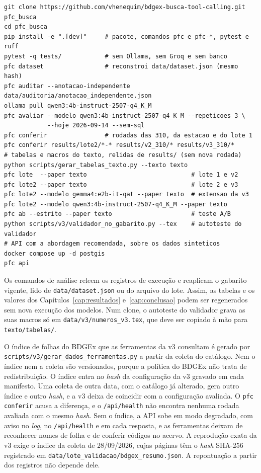 {\footnotesize
\begin{verbatim}
git clone https://github.com/vhenequim/bdgex-busca-tool-calling.git pfc_busca
cd pfc_busca
pip install -e ".[dev]"     # pacote, comandos pfc e pfc-*, pytest e ruff
pytest -q tests/            # sem Ollama, sem Groq e sem banco
pfc dataset                 # reconstroi data/dataset.json (mesmo hash)
pfc auditar --anotacao-independente data/auditoria/anotacao_independente.json
ollama pull qwen3:4b-instruct-2507-q4_K_M
pfc avaliar --modelo qwen3:4b-instruct-2507-q4_K_M --repeticoes 3 \
            --hoje 2026-09-14 --sem-sql
pfc conferir                # rodadas das 310, da estacao e do lote 1
pfc conferir results/lote2/*-* results/v2_310/* results/v3_310/*
# tabelas e macros do texto, relidas de results/ (sem nova rodada)
python scripts/gerar_tabelas_texto.py --texto texto
pfc lote  --paper texto                             # lote 1 e v2
pfc lote2 --paper texto                             # lote 2 e v3
pfc lote2 --modelo gemma4:e2b-it-qat --paper texto  # extensao da v3
pfc lote2 --modelo qwen3:4b-instruct-2507-q4_K_M --paper texto
pfc ab --estrito --paper texto                      # teste A/B
python scripts/v3/validador_no_gabarito.py --tex    # autoteste do validador
# API com a abordagem recomendada, sobre os dados sinteticos
docker compose up -d postgis
pfc api
\end{verbatim}
}

Os comandos de análise releem os registros de execução e reaplicam o gabarito vigente, lido de \texttt{data/dataset.json} ou do arquivo do lote. Assim, as tabelas e os valores dos Capítulos~\ref{cap:resultados} e~\ref{cap:conclusao} podem ser regenerados sem nova execução dos modelos. Num clone, o autoteste do validador grava as suas macros só em \texttt{data/\allowbreak v3/\allowbreak numeros\_v3.tex}, que deve ser copiado à mão para \texttt{texto/\allowbreak tabelas/}.

O índice de folhas do BDGEx que as ferramentas da v3 consultam é gerado por \texttt{scripts/v3/gerar\_dados\_ferramentas.py} a partir da coleta do catálogo. Nem o índice nem a coleta são versionados, porque a política do BDGEx não trata de redistribuição. O índice entra no \textit{hash} da configuração da v3 gravado em cada manifesto. Uma coleta de outra data, com o catálogo já alterado, gera outro índice e outro \textit{hash}, e a v3 deixa de coincidir com a configuração avaliada. O \texttt{pfc conferir} acusa a diferença, e o \texttt{/api/health} não encontra nenhuma rodada avaliada com o mesmo \textit{hash}. Sem o índice, a API sobe em modo degradado, com aviso no \textit{log}, no \texttt{/api/health} e em cada resposta, e as ferramentas deixam de reconhecer nomes de folha e de conferir códigos no acervo. A reprodução exata da v3 exige o índice da coleta de 28/09/2026, cujas páginas têm o \textit{hash} SHA-256 registrado em \texttt{data/\allowbreak lote\_validacao/\allowbreak bdgex\_resumo.json}. A repontuação a partir dos registros não depende dele.

